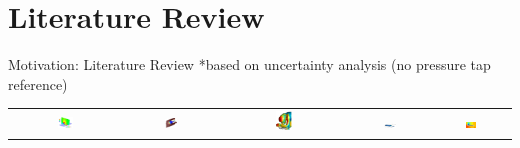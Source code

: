 \documentclass{beamer}
\begin{document}
\section{Literature Review}
\begin{frame}{Motivation: Literature Review}
    \footnotesize{*based on uncertainty analysis (no pressure tap reference)}
    \begin{tabular}{ccccc}
        \includegraphics[width = 0.15\textwidth]{figs/for_pres/0012_tagliabue.png} &
        \includegraphics[width = 0.15\textwidth]{figs/for_pres/sphere.png} &
        \includegraphics[width = 0.13\textwidth]{figs/for_pres/cyclist.png} &
        \includegraphics[width = 0.18\textwidth]{figs/for_pres/bullet_step.png} &
        \includegraphics[width = 0.15\textwidth]{figs/for_pres/0012_ragni.png} 
    \end{tabular}
\end{frame}
\end{document}
